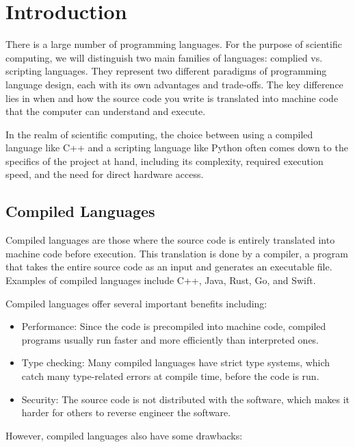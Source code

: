 \section{Introduction}

There is a large number of programming languages. For the purpose of scientific computing, we will distinguish two main families of languages: complied vs. scripting languages. They  represent two different paradigms of programming language design, each with its own advantages and trade-offs. The key difference lies in when and how the source code you write is translated into machine code that the computer can understand and execute.

In the realm of scientific computing, the choice between using a compiled language like C++ and a scripting language like Python often comes down to the specifics of the project at hand, including its complexity, required execution speed, and the need for direct hardware access.

\subsection{Compiled Languages}

Compiled languages are those where the source code is entirely translated into machine code before execution. This translation is done by a compiler, a program that takes the entire source code as an input and generates an executable file. Examples of compiled languages include C++, Java, Rust, Go, and Swift.

Compiled languages offer several important benefits including:

\begin{itemize}
	\item Performance: Since the code is precompiled into machine code, compiled programs usually run faster and more efficiently than interpreted ones.
	\item Type checking: Many compiled languages have strict type systems, which catch many type-related errors at compile time, before the code is run.
	\item Security: The source code is not distributed with the software, which makes it harder for others to reverse engineer the software.
\end{itemize}

However, compiled languages also have some drawbacks:


